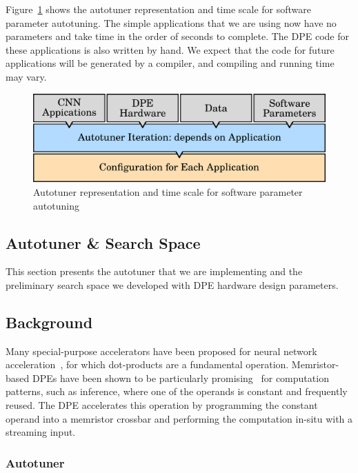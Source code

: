 Figure~\ref{fig:overview-dpe-app} shows the autotuner representation and time
scale for software parameter autotuning. The simple applications that we are
using now have no parameters and take time in the order of seconds to complete.
The DPE code for these applications is also written by hand. We expect that the
code for future applications will be generated by a compiler, and compiling and
running time may vary.

\begin{figure}[htpb]
    \centering
    \includegraphics[width=.65\textwidth]{./images/overview_dpe_app}
    \caption{Autotuner representation and time scale for software parameter
    autotuning}
    \label{fig:overview-dpe-app}
\end{figure}

\subsection{Autotuner \& Search Space}
\label{sec:DPEautotuning}

This section presents the autotuner that we are implementing and the
preliminary search space we developed with DPE hardware design parameters.

\subsection{Background}

Many special-purpose accelerators have been proposed for neural network
acceleration~\cite{chen2014dadiannao,chi2016prime,shafiee2016isaac}, for which
dot-products are a fundamental operation.  Memristor-based DPEs have been shown
to be particularly promising~\cite{shafiee2016isaac} for computation patterns,
such as inference, where one of the operands is constant and frequently reused.
The DPE accelerates this operation by programming the constant operand into a
memristor crossbar and performing the computation in-situ with a streaming
input.

\subsubsection{Autotuner}

